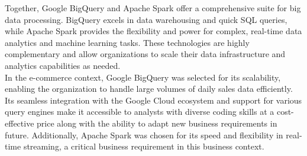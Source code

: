 Together, Google BigQuery and Apache Spark offer a comprehensive suite for big data processing.
BigQuery excels in data warehousing and quick SQL queries, while Apache Spark provides the
flexibility and power for complex, real-time data analytics and machine learning tasks. These
technologies are highly complementary and allow organizations to scale their data infrastructure and
analytics capabilities as needed.\\
In the e-commerce context, Google BigQuery was selected for its scalability, enabling the organization 
to handle large volumes of daily sales data efficiently. Its seamless integration with the Google Cloud 
ecosystem and support for various query engines make it accessible to analysts with diverse coding skills 
at a cost-effective price along with the ability to adapt new business requirements in future. Additionally, 
Apache Spark was chosen for its speed and flexibility in real-time streaming, a critical business requirement in 
this business context.
